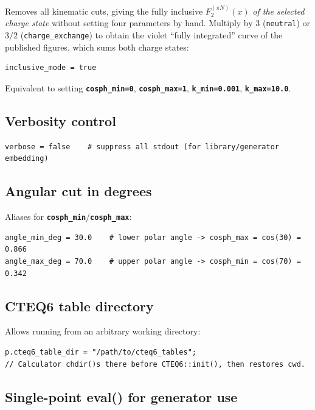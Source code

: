 \documentclass[11pt,a4paper]{article}
\newcommand{\inikey}[1]{\texttt{\textbf{#1}}}
\begin{document}
Removes all kinematic cuts, giving the fully inclusive
$F_2^{(\pi N)}(x)$ \emph{of the selected charge state} without setting
four parameters by hand.  Multiply by 3 (\texttt{neutral}) or $3/2$
(\texttt{charge\_exchange}) to obtain the violet ``fully integrated''
curve of the published figures, which sums both charge states:

\begin{lstlisting}[style=iniStyle]
inclusive_mode = true
\end{lstlisting}

Equivalent to setting \inikey{cosph\_min=0}, \inikey{cosph\_max=1},
\inikey{k\_min=0.001}, \inikey{k\_max=10.0}.

\subsection{Verbosity control}

\begin{lstlisting}[style=iniStyle]
verbose = false    # suppress all stdout (for library/generator embedding)
\end{lstlisting}

\subsection{Angular cut in degrees}

Aliases for \inikey{cosph\_min}/\inikey{cosph\_max}:

\begin{lstlisting}[style=iniStyle]
angle_min_deg = 30.0    # lower polar angle -> cosph_max = cos(30) = 0.866
angle_max_deg = 70.0    # upper polar angle -> cosph_min = cos(70) = 0.342
\end{lstlisting}

\subsection{CTEQ6 table directory}

Allows running from an arbitrary working directory:

\begin{lstlisting}[style=cppstyle]
p.cteq6_table_dir = "/path/to/cteq6_tables";
// Calculator chdir()s there before CTEQ6::init(), then restores cwd.
\end{lstlisting}

\subsection{Single-point eval() for generator use}
\end{document}
